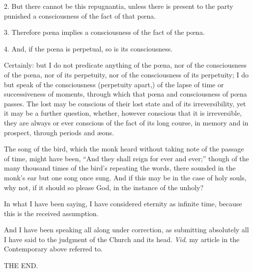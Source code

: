 2. But there cannot be this repugnantia, unless there is present to
the party punished a consciousness of the fact of that pœna.


3. Therefore pœna implies a consciousness of the fact of the pœna.


4. And, if the pœna is perpetual, so is its consciousness.


Certainly: but I do not predicate anything of the pœna, nor of the
consciousness of the pœna, nor of its perpetuity, nor of the
consciousness of its perpetuity; I do but speak of the consciousness
(perpetuity apart,) of the lapse of time or successiveness of moments,
through which that pœna and consciousness of pœna passes. The lost
may be conscious of their lost state and of its irreversibility, yet
it may be a further question, whether, however conscious that it is
irreversible, they are always or ever conscious of the fact of its
long course, in memory and in prospect, through periods and æons.


The song of the bird, which the monk heard without taking note of
the passage of time, might have been, ``And they shall reign for
ever and ever;'' though of the many thousand times of the bird's
repeating the words, there sounded in the monk's ear but one song once
sung. And if this may be in the case of holy souls, why not, if it
should so please God, in the instance of the unholy?


In what I have been saying, I have considered eternity as infinite
time, because this is the received assumption.


And I have been speaking all along under correction, as submitting
absolutely all I have said to the judgment of the Church and its head.
\emph{Vid}. my article in the Contemporary above referred to.

THE END.
